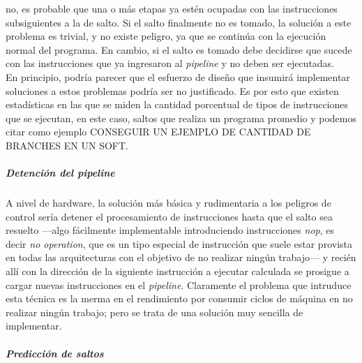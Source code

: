 no, es probable que una o más etapas ya estén ocupadas con las instrucciones 
subsiguientes a la de salto. Si el salto finalmente no es tomado, la solución a 
este problema es trivial, y no existe peligro, ya que se continúa con la 
ejecución normal del programa. En cambio, si el salto es tomado debe decidirse 
que sucede con las instrucciones que ya ingresaron al \emph{pipeline} y no 
deben ser ejecutadas.\\
En principio, podría parecer que el esfuerzo de diseño que insumirá implementar 
soluciones a estos problemas podría ser no justificado. Es por esto que existen 
estadísticas en las que se miden la cantidad porcentual de tipos de 
instrucciones que se ejecutan, en este caso, saltos que realiza un programa 
promedio y podemos citar como ejemplo CONSEGUIR UN EJEMPLO DE CANTIDAD DE 
BRANCHES EN UN SOFT.

\subparagraph{Detención del \emph{pipeline}}
\label{subpar:optimizations-ilp-pipeline-control_dependencies-pipeline_stall}

A nivel de hardware, la solución más básica y rudimentaria a los peligros de 
control sería detener el procesamiento de instrucciones hasta que el salto sea 
resuelto ---algo fácilmente implementable introduciendo instrucciones 
\emph{nop}, es decir \emph{no operation}, que es un tipo especial de instrucción 
que suele estar provista en todas las arquitecturas con el objetivo de no 
realizar ningún trabajo--- y recién allí con la dirección de la siguiente 
instrucción a ejecutar calculada se prosigue a cargar nuevas instrucciones en el 
\emph{pipeline}. Claramente el problema que intruduce esta técnica es la merma 
en el rendimiento por consumir ciclos de máquina en no realizar ningún trabajo; 
pero se trata de una solución muy sencilla de implementar.

\subparagraph{Predicción de saltos}
\label{subpar:optimizations-ilp-pipeline-data_dependencies-branch_prediction}

